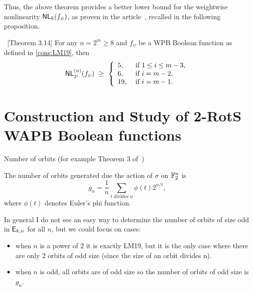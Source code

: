 \documentclass{llncs}
\begin{document}
Thus, the above theorem provides a better lower bound for the weightwise nonlinearity $\mathsf{NL}_{k}(f_\psi)$, as proven in the article~\cite{DCC:LiuMes19}, recalled in the following proposition.
\begin{proposition}~\cite{DCC:LiuMes19}[Theorem 3.14]
For any $n = 2^m \geq 8$ and $f_\psi$ be a WPB Boolean function as defined in \ref{cons:LM19}, then $$\mathsf{NL}_{2^i}^{(n)}(f_\psi) ~\geq ~ \left \{ 
\begin{array}{ll}
5,  &  \text{ if } 1 \leq i \leq m-3, \\
6,  &  \text{ if } i = m-2, \\
19, &  \text{ if } i = m-1.
\end{array} \right. $$	
\end{proposition}

\section{Construction and Study of 2-RotS WAPB Boolean functions}




Number of orbits (for example Theorem 3 of~\cite{DAM:StaMai08})

\begin{theorem}
	The number of orbits generated due the action of $\sigma$ on $\mathbb{F}_2^n$ is
	$$g_n= \frac{1}{n} \sum_{t \text{ divides } n}  \phi(t) 2^{n/t},$$
where $\phi(t)$ denotes Euler's phi function.
\end{theorem}


In general I do not see an easy way to determine the number of orbits of size odd in $\mathsf{E}_{k,n}$ for all $n$, but we could focus on cases:

\begin{itemize}
	\item when $n$ is a power of $2$ it is exactly LM19, but it is the only case where there are only 2 orbits of odd size (since the size of an orbit divides n).
	\item when $n$ is odd, all orbits are of odd size so the number of orbits of odd size is $g_n$.	
\end{itemize}
\end{document}
